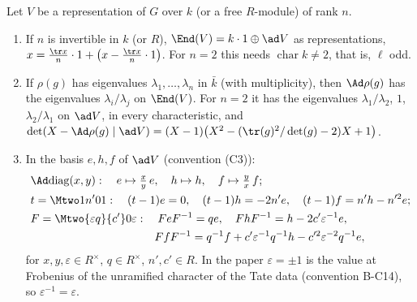 \begin{proposition}\label{prop:reps:adjoint}
Let $V$ be a representation of $G$ over $k$ (or a free $R$-module) of rank $n$.
\begin{enumerate}[label=(\roman*)]
\item If $n$ is invertible in $k$ (or $R$), $\End(V)=k\cdot1\oplus\ad V$ as representations, $x=\frac{\tr x}n\cdot1+\bigl(x-\frac{\tr x}n\cdot1\bigr)$. For $n=2$ this needs
$\operatorname{char}k\ne2$, that is, $\ell$ odd.
\item If $\rho(g)$ has eigenvalues $\lambda_1,\dots,\lambda_n$ in $\bar k$ (with multiplicity), then $\Ad\rho(g)$ has the eigenvalues $\lambda_i/\lambda_j$ on $\End(V)$. For
$n=2$ it has the eigenvalues $\lambda_1/\lambda_2$, $1$, $\lambda_2/\lambda_1$ on $\ad V$, in every characteristic, and
$\det(X-\Ad\rho(g)\mid\ad V)=(X-1)\bigl(X^2-(\tr(g)^2/\det(g)-2)X+1\bigr)$.
\item In the basis $e,h,f$ of $\ad V$ (convention (C3)):
\begin{align*}
&\Ad\mathrm{diag}(x,y):\quad e\mapsto\tfrac xy\,e,\quad h\mapsto h,\quad f\mapsto\tfrac yx\,f;\\
&t=\Mtwo1{n'}01:\quad (t-1)e=0,\quad (t-1)h=-2n'e,\quad (t-1)f=n'h-n'^2e;\\
&F=\Mtwo{\varepsilon q}{c'}0\varepsilon:\quad FeF^{-1}=qe,\quad FhF^{-1}=h-2c'\varepsilon^{-1}e,\\
&\phantom{F=\Mtwo{\varepsilon q}{c'}0\varepsilon:\quad}FfF^{-1}=q^{-1}f+c'\varepsilon^{-1}q^{-1}h-c'^2\varepsilon^{-2}q^{-1}e,
\end{align*}
for $x,y,\varepsilon\in R^\times$, $q\in R^\times$, $n',c'\in R$. In the paper $\varepsilon=\pm1$ is the value at Frobenius of the unramified character of the Tate data
(convention B-C14), so $\varepsilon^{-1}=\varepsilon$.
\end{enumerate}
\end{proposition}

